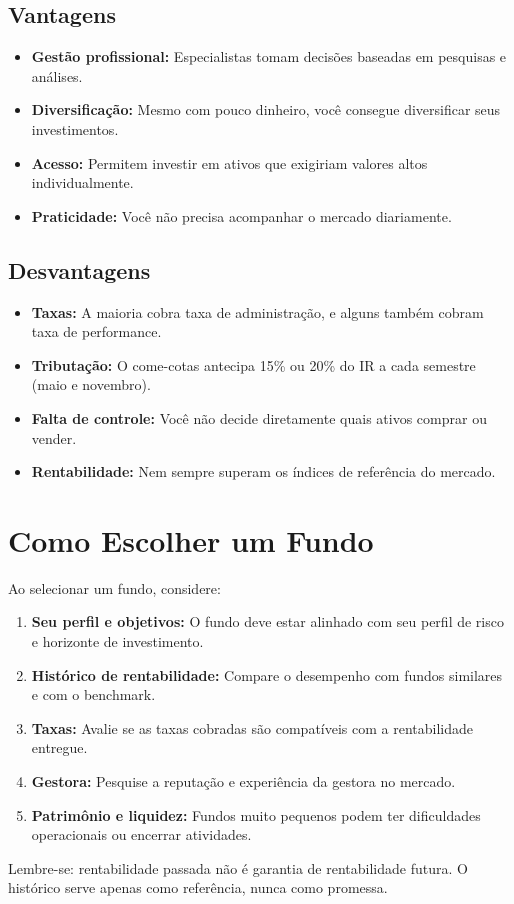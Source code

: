 \subsection{Vantagens}
\begin{itemize}[leftmargin=*]
    \item \textbf{Gestão profissional:} Especialistas tomam decisões baseadas em pesquisas e análises.
    \item \textbf{Diversificação:} Mesmo com pouco dinheiro, você consegue diversificar seus investimentos.
    \item \textbf{Acesso:} Permitem investir em ativos que exigiriam valores altos individualmente.
    \item \textbf{Praticidade:} Você não precisa acompanhar o mercado diariamente.
\end{itemize}

\subsection{Desvantagens}
\begin{itemize}[leftmargin=*]
    \item \textbf{Taxas:} A maioria cobra taxa de administração, e alguns também cobram taxa de performance.
    \item \textbf{Tributação:} O come-cotas antecipa 15\% ou 20\% do IR a cada semestre (maio e novembro).
    \item \textbf{Falta de controle:} Você não decide diretamente quais ativos comprar ou vender.
    \item \textbf{Rentabilidade:} Nem sempre superam os índices de referência do mercado.
\end{itemize}

\section{Como Escolher um Fundo}

\noindent Ao selecionar um fundo, considere:

\begin{enumerate}
    \item \textbf{Seu perfil e objetivos:} O fundo deve estar alinhado com seu perfil de risco e horizonte de investimento.
    \item \textbf{Histórico de rentabilidade:} Compare o desempenho com fundos similares e com o benchmark.
    \item \textbf{Taxas:} Avalie se as taxas cobradas são compatíveis com a rentabilidade entregue.
    \item \textbf{Gestora:} Pesquise a reputação e experiência da gestora no mercado.
    \item \textbf{Patrimônio e liquidez:} Fundos muito pequenos podem ter dificuldades operacionais ou encerrar atividades.
\end{enumerate}

\vspace{0 cm}
\noindent Lembre-se: rentabilidade passada não é garantia de rentabilidade futura. O histórico serve apenas como referência, nunca como promessa.